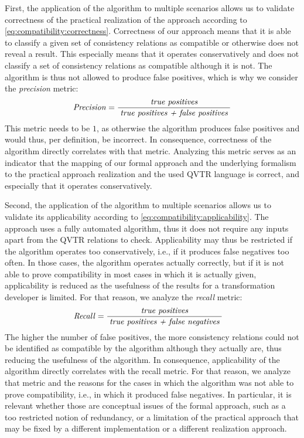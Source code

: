 First, the application of the algorithm to multiple scenarios allows us to validate correctness of the practical realization of the approach according to \autoref{eq:compatibility:correctness}.
Correctness of our approach means that it is able to classify a given set of consistency relations as compatible or otherwise does not reveal a result.
This especially means that it operates conservatively and does not classify a set of consistency relations as compatible although it is not.
The algorithm is thus not allowed to produce false positives, which is why we consider the \emph{precision} metric:
\begin{align*}
    \hspace{1em} &
    \mathit{Precision} = \frac{\; \textit{true positives} \;}{\; \textit{true positives + false positives} \;}
\end{align*}
This metric needs to be $1$, as otherwise the algorithm produces false positives and would thus, per definition, be incorrect.
In consequence, correctness of the algorithm directly correlates with that metric.
Analyzing this metric serves as an indicator that the mapping of our formal approach and the underlying formalism to the practical approach realization and the used \gls{QVTR} language is correct, and especially that it operates conservatively.

Second, the application of the algorithm to multiple scenarios allows us to validate its applicability according to \autoref{eq:compatibility:applicability}.
The approach uses a fully automated algorithm, thus it does not require any inputs apart from the \gls{QVTR} relations to check.
Applicability may thus be restricted if the algorithm operates too conservatively, i.e., if it produces false negatives too often.
In those cases, the algorithm operates actually correctly, but if it is not able to prove compatibility in most cases in which it is actually given, applicability is reduced as the usefulness of the results for a transformation developer is limited.
For that reason, we analyze the \emph{recall} metric:
\begin{align*}
    &
    \mathit{Recall} = \frac{\; \textit{true positives} \;}{\; \textit{true positives + false negatives} \;}
\end{align*}
The higher the number of false positives, the more consistency relations could not be identified as compatible by the algorithm although they actually are, thus reducing the usefulness of the algorithm.
In consequence, applicability of the algorithm directly correlates with the recall metric.
For that reason, we analyze that metric and the reasons for the cases in which the algorithm was not able to 
prove compatibility, i.e., in which it produced false negatives.
In particular, it is relevant whether those are conceptual issues of the formal approach, such as a too restricted notion of redundancy, or a limitation of the practical approach that may be fixed by a different implementation or a different realization approach.


